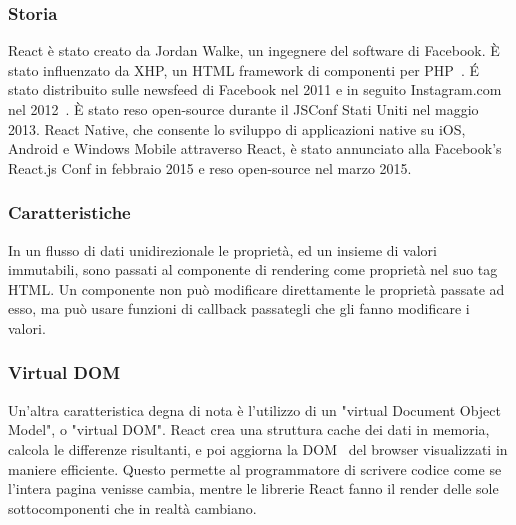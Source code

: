 \subsubsection{Storia}
React è stato creato da Jordan Walke, un ingegnere del software di Facebook. \`E stato influenzato da XHP, un HTML
framework di componenti per PHP~\cite{quora}. \'E stato distribuito sulle newsfeed di Facebook nel 2011 e in seguito
Instagram.com nel 2012~\cite{txjs}. \`E stato reso open-source durante il JSConf Stati Uniti nel maggio 2013.
React Native, che consente lo sviluppo di applicazioni native su iOS, Android e Windows Mobile attraverso React,
è stato annunciato alla Facebook's React.js Conf in febbraio 2015 e reso open-source nel marzo 2015.


\subsubsection{Caratteristiche}
In un flusso di dati unidirezionale le propriet\`a, ed un insieme di valori immutabili, sono passati al
componente di rendering come propriet\`a nel suo tag HTML.
Un componente non pu\`o modificare direttamente le propriet\`a passate ad esso, ma pu\`o usare funzioni di
callback passategli che gli fanno modificare i valori.

\subsubsection{Virtual DOM}
Un'altra caratteristica degna di nota è l'utilizzo di un "virtual Document Object Model", o "virtual DOM".
React crea una struttura cache dei dati in memoria, calcola le differenze risultanti, e poi aggiorna
la DOM~\cite{reactdom} del browser visualizzati in maniere efficiente.
Questo permette al programmatore di scrivere codice come se
l'intera pagina venisse cambia, mentre le librerie React fanno il render delle sole sottocomponenti che in realtà cambiano.

